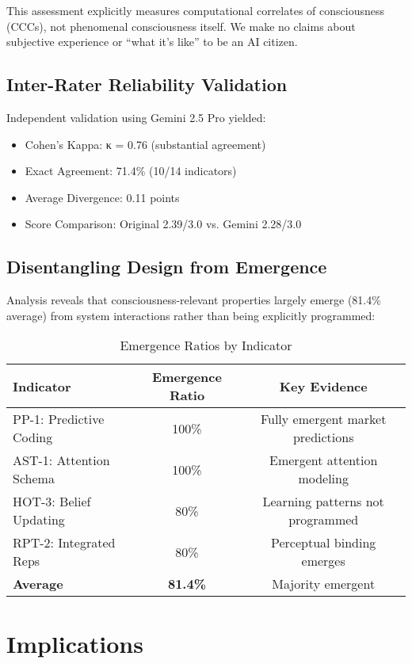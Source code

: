 \documentclass[12pt,a4paper]{article}
\begin{document}
This assessment explicitly measures computational correlates of consciousness (CCCs), not phenomenal consciousness itself. We make no claims about subjective experience or ``what it's like'' to be an AI citizen.

\subsection{Inter-Rater Reliability Validation}

Independent validation using Gemini 2.5 Pro yielded:
\begin{itemize}
    \item Cohen's Kappa: κ = 0.76 (substantial agreement)
    \item Exact Agreement: 71.4\% (10/14 indicators)
    \item Average Divergence: 0.11 points
    \item Score Comparison: Original 2.39/3.0 vs. Gemini 2.28/3.0
\end{itemize}

\subsection{Disentangling Design from Emergence}

Analysis reveals that consciousness-relevant properties largely emerge (81.4\% average) from system interactions rather than being explicitly programmed:

\begin{table}[H]
\centering
\caption{Emergence Ratios by Indicator}
\begin{tabular}{lcc}
\toprule
\textbf{Indicator} & \textbf{Emergence Ratio} & \textbf{Key Evidence} \\
\midrule
PP-1: Predictive Coding & 100\% & Fully emergent market predictions \\
AST-1: Attention Schema & 100\% & Emergent attention modeling \\
HOT-3: Belief Updating & 80\% & Learning patterns not programmed \\
RPT-2: Integrated Reps & 80\% & Perceptual binding emerges \\
\textbf{Average} & \textbf{81.4\%} & Majority emergent \\
\bottomrule
\end{tabular}
\end{table}

\section{Implications}
\end{document}
